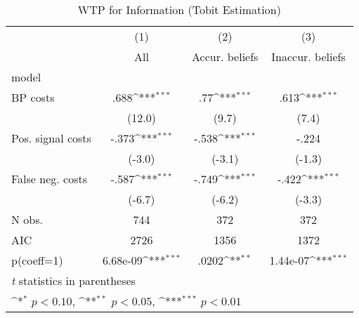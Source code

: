 \begin{table}[htbp]\centering
\def\sym#1{\ifmmode^{#1}\else\(^{#1}\)\fi}
\caption{WTP for Information (Tobit Estimation)}
\begin{tabular}{l*{3}{c}}
\hline\hline
                &\multicolumn{1}{c}{(1)}&\multicolumn{1}{c}{(2)}&\multicolumn{1}{c}{(3)}\\
                &\multicolumn{1}{c}{All}&\multicolumn{1}{c}{Accur. beliefs}&\multicolumn{1}{c}{Inaccur. beliefs}\\
\hline
model           &                  &                  &                  \\
BP costs        &     .688\sym{***}&      .77\sym{***}&     .613\sym{***}\\
                &   (12.0)         &    (9.7)         &    (7.4)         \\
Pos. signal costs&    -.373\sym{***}&    -.538\sym{***}&    -.224         \\
                &   (-3.0)         &   (-3.1)         &   (-1.3)         \\
False neg. costs&    -.587\sym{***}&    -.749\sym{***}&    -.422\sym{***}\\
                &   (-6.7)         &   (-6.2)         &   (-3.3)         \\
\hline
N obs.          &      744         &      372         &      372         \\
AIC             &     2726         &     1356         &     1372         \\
p(coeff=1)      & 6.68e-09\sym{***}&    .0202\sym{**} & 1.44e-07\sym{***}\\
\hline\hline
\multicolumn{4}{l}{\footnotesize \textit{t} statistics in parentheses}\\
\multicolumn{4}{l}{\footnotesize \sym{*} \(p<0.10\), \sym{**} \(p<0.05\), \sym{***} \(p<0.01\)}\\
\end{tabular}
\end{table}
